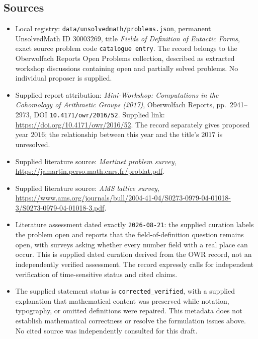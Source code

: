\documentclass[11pt]{article}
\begin{document}
\subsection{Sources}
\begin{itemize}
\item Local registry: \texttt{data/unsolvedmath/problems.json}, permanent UnsolvedMath ID \(30003269\), title \emph{Fields of Definition of Eutactic Forms}, exact source problem code \texttt{catalogue entry}. The record belongs to the Oberwolfach Reports Open Problems collection, described as extracted workshop discussions containing open and partially solved problems. No individual proposer is supplied.
\item Supplied report attribution: \emph{Mini-Workshop: Computations in the Cohomology of Arithmetic Groups (2017)}, Oberwolfach Reports, pp.\ 2941--2973, DOI \texttt{10.4171/owr/2016/52}. Supplied link: \url{https://doi.org/10.4171/owr/2016/52}. The record separately gives proposed year \(2016\); the relationship between this year and the title's \(2017\) is unresolved.
\item Supplied literature source: \emph{Martinet problem survey}, \url{https://jamartin.perso.math.cnrs.fr/problat.pdf}.
\item Supplied literature source: \emph{AMS lattice survey}, \url{https://www.ams.org/journals/bull/2004-41-04/S0273-0979-04-01018-3/S0273-0979-04-01018-3.pdf}.
\item Literature assessment dated exactly \texttt{2026-08-21}: the supplied curation labels the problem open and reports that the field-of-definition question remains open, with surveys asking whether every number field with a real place can occur. This is supplied dated curation derived from the OWR record, not an independently verified assessment. The record expressly calls for independent verification of time-sensitive status and cited claims.
\item The supplied statement status is \texttt{corrected\_verified}, with a supplied explanation that mathematical content was preserved while notation, typography, or omitted definitions were repaired. This metadata does not establish mathematical correctness or resolve the formulation issues above. No cited source was independently consulted for this draft.
\end{itemize}
\end{document}
